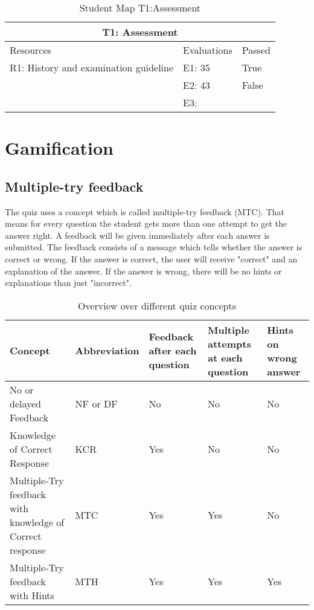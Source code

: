 \begin{table}[h!]
	\begin{tabular}{ | m{12em} | m{8em}| m{5em} | } 
		\hline
		\multicolumn{3}{c}{\bfseries T1: Assessment} \\
		\hline
		Resources & Evaluations & Passed \\
		\hline
		R1: History and examination guideline & E1: 35 & True \\
		& E2: 43 & False \\
		& E3: &  \\
		\hline
	\end{tabular}
	\caption{Student Map T1:Assessment}
	\label{table:StudentMap}
\end{table}



\section{Gamification}
\subsection{Multiple-try feedback}
The quiz uses a concept which is called multiple-try feedback (MTC). That means for every question the student gets more than one attempt to get the answer right. A feedback will be given immediately after each answer is submitted. The feedback consists of a message which tells whether the answer is correct or wrong. If the answer is correct, the user will receive "correct" and an explanation of the answer. If the answer is wrong, there will be no hints or explanations than just "incorrect".

\begin{table}[h!]
\begin{tabular}{ | m{7em} | m{6em}| m{5em} | m{5em} | m{5em} | } 
	\hline
	\textbf{Concept} & \textbf{Abbreviation} & \textbf{Feedback after each question} & \textbf{Multiple attempts at each question} & \textbf{Hints on wrong answer} \\ [0.5ex]
	\hline
No or delayed Feedback & NF or DF & No & No & No  \\
\hline
Knowledge of Correct Response & KCR  & Yes & No & No \\
\hline
Multiple-Try feedback with knowledge of Correct response  & MTC & Yes & Yes & No \\
\hline
Multiple-Try feedback with Hints & MTH & Yes & Yes & Yes \\
\hline
\end{tabular}
\caption{Overview over different quiz concepts}
\end{table}

